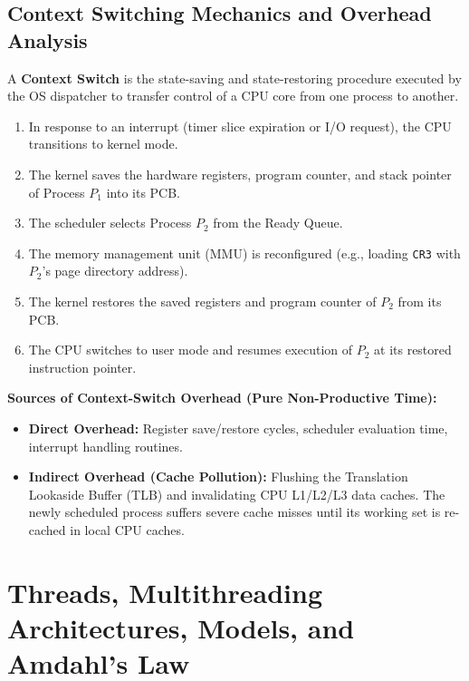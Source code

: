 \subsection{Context Switching Mechanics and Overhead Analysis}
A \textbf{Context Switch} is the state-saving and state-restoring procedure executed by the OS dispatcher to transfer control of a CPU core from one process to another.
\begin{enumerate}
    \item In response to an interrupt (timer slice expiration or I/O request), the CPU transitions to kernel mode.
    \item The kernel saves the hardware registers, program counter, and stack pointer of Process $P_1$ into its PCB.
    \item The scheduler selects Process $P_2$ from the Ready Queue.
    \item The memory management unit (MMU) is reconfigured (e.g., loading \texttt{CR3} with $P_2$'s page directory address).
    \item The kernel restores the saved registers and program counter of $P_2$ from its PCB.
    \item The CPU switches to user mode and resumes execution of $P_2$ at its restored instruction pointer.
\end{enumerate}

\textbf{Sources of Context-Switch Overhead (Pure Non-Productive Time):}
\begin{itemize}
    \item \textbf{Direct Overhead:} Register save/restore cycles, scheduler evaluation time, interrupt handling routines.
    \item \textbf{Indirect Overhead (Cache Pollution):} Flushing the Translation Lookaside Buffer (TLB) and invalidating CPU L1/L2/L3 data caches. The newly scheduled process suffers severe cache misses until its working set is re-cached in local CPU caches.
\end{itemize}



\section{Threads, Multithreading Architectures, Models, and Amdahl's Law}
\label{sec:os_threads}

